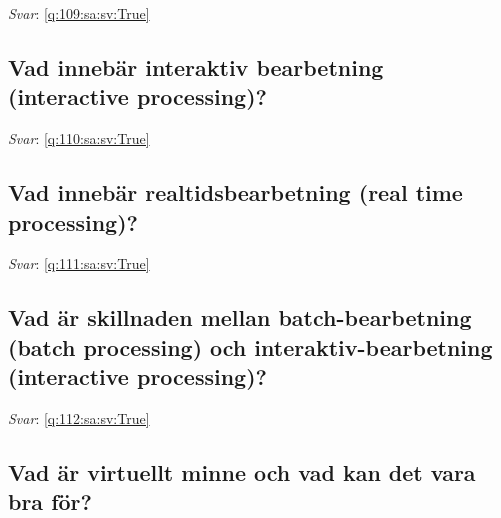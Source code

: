 \documentclass[a4paper,11pt,oneside]{article}
\begin{document}
\begin{sloppypar}
\noindent\makebox[\textwidth]{\hrulefill}

\vspace{1cm}

\textit{Svar}: \autoref{q:109:sa:sv:True}



\subsection{Vad inneb\"ar interaktiv bearbetning (interactive processing)?}

\label{q:110:sa:sv:False}

\vspace{2cm}

\noindent\makebox[\textwidth]{\hrulefill}

\vspace{1cm}

\textit{Svar}: \autoref{q:110:sa:sv:True}



\subsection{Vad inneb\"ar realtidsbearbetning (real time processing)?}

\label{q:111:sa:sv:False}

\vspace{2cm}

\noindent\makebox[\textwidth]{\hrulefill}

\vspace{1cm}

\textit{Svar}: \autoref{q:111:sa:sv:True}



\subsection{Vad \"ar skillnaden mellan batch-bearbetning (batch processing) och interaktiv-bearbetning (interactive processing)?}

\label{q:112:sa:sv:False}

\vspace{2cm}

\noindent\makebox[\textwidth]{\hrulefill}

\vspace{1cm}

\textit{Svar}: \autoref{q:112:sa:sv:True}



\subsection{Vad \"ar virtuellt minne och vad kan det vara bra f\"or?}


\end{sloppypar}
\end{document}
